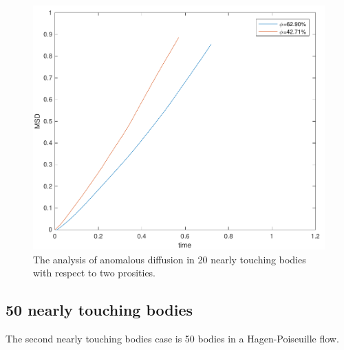 \documentclass[preprint, 10pt]{elsarticle}
\begin{document}
\begin{figure}[H]
\center
\includegraphics*[width =0.5\linewidth]{./figs/anomalous_diffusion20d}
\caption{\label{fig:Eroding20anomalous} The analysis of anomalous diffusion in
 20 nearly touching bodies with respect to two prosities. }
\end{figure}
\subsection{50 nearly touching bodies}
{\color{red}
The second nearly touching bodies case is 50 bodies in a Hagen-Poiseuille flow.
}

\end{document}
